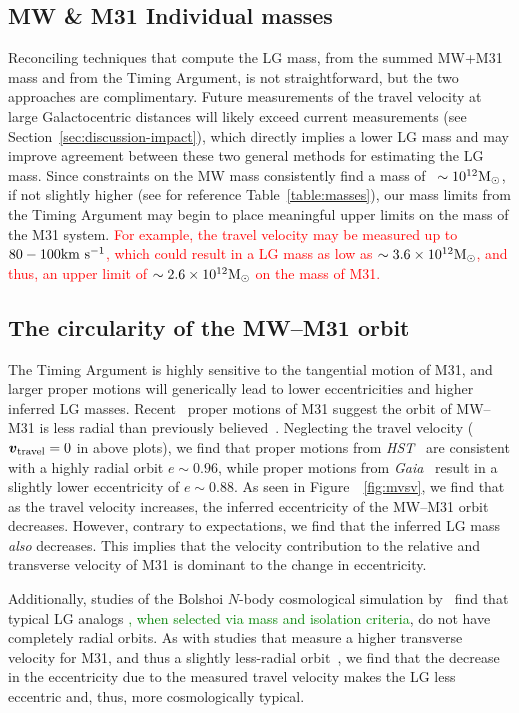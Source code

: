 \documentclass[twocolumn]{aastex631}
\newcommand{\remove}[1]{\textcolor{red}{#1}}
\newcommand{\add}[1]{\textcolor{green}{#1}}
\newcommand{\bov}{\ensuremath{\boldsymbol{v}}}
\newcommand{\vtrav}{\ensuremath{\bov_{\rm travel}}}
\begin{document}
\subsection{MW \& M31 Individual masses}
Reconciling techniques that compute the LG mass, from the summed MW+M31 mass and
from the Timing Argument, is not straightforward, but the two approaches
are complimentary.
Future measurements of the travel velocity at large Galactocentric distances
will likely exceed current measurements (see
Section~\ref{sec:discussion-impact}), which
directly implies a lower LG mass and may improve agreement between these two
general methods for estimating the LG mass.
Since constraints on the MW mass consistently find a mass of
~$\sim10^{12}\mathrm{M}_\odot$, if not slightly higher (see for reference
Table~\ref{table:masses}), our mass limits from the Timing Argument may begin to
place meaningful upper limits on the mass of the M31 system.
\remove{For example, the travel velocity may be measured up to $80-100\mathrm{km}~\mathrm{s}^{-1}$, which could
result in a LG mass as low as $\sim3.6\times10^{12}\mathrm{M}_\odot$, and thus, an upper
limit of $\sim2.6\times10^{12}\mathrm{M}_\odot$ on the mass of M31.}


\subsection{The circularity of the MW--M31 orbit}
The Timing Argument is highly sensitive to the tangential motion of M31, and
larger proper motions will generically lead to lower eccentricities and higher
inferred LG masses.
Recent \gaia\ proper motions of M31 suggest the orbit of MW--M31 is less radial
than previously believed~\citep{vdm2019,Salomon2021}.
Neglecting the travel velocity ($\vtrav=0$ in above plots), we find that proper
motions from \textit{HST}~\citep{vdm2012} are consistent with a highly radial
orbit $e\sim0.96$, while proper motions from \textit{Gaia}~\citep{Salomon2021}
result in a slightly lower eccentricity of $e\sim0.88$.
As seen in Figure~~\ref{fig:mvsv}, we find that as the travel velocity
increases, the inferred eccentricity of the MW--M31 orbit decreases.
However, contrary to expectations, we find that the inferred LG mass
\textit{also} decreases.
This implies that the velocity contribution to the relative and transverse
velocity of M31 is dominant to the change in eccentricity.

Additionally, studies of the Bolshoi $N$-body cosmological simulation
by~\cite{Forero-Romero2013} find that typical LG analogs 
\add{, when selected via mass and isolation criteria},
do not have completely radial orbits.
As with studies that measure a higher transverse velocity for M31, and thus a
slightly less-radial orbit~\citep{vdm2019,Salomon2021}, we find that the
decrease in the eccentricity due to the measured travel velocity makes the LG
less eccentric and, thus, more cosmologically typical.
\end{document}
